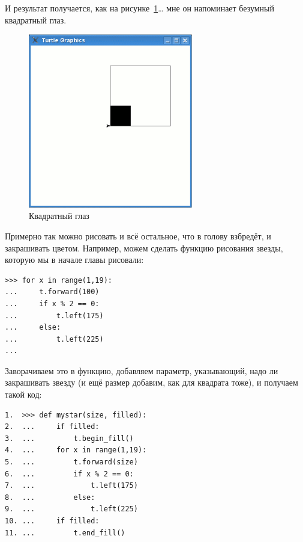 И результат получается, как на рисунке \ref{fig28}… мне он напоминает безумный квадратный глаз.

\begin{figure}
\begin{center}
\includegraphics[width=72mm]{../en/figure28.eps}
\end{center}
\caption{Квадратный глаз}\label{fig28}
\end{figure}

Примерно так можно рисовать и всё остальное, что в голову взбредёт, и закрашивать цветом. Например, можем сделать функцию рисования звезды, которую мы в начале главы рисовали:

\begin{listing}
\begin{verbatim}
>>> for x in range(1,19):
...     t.forward(100)
...     if x % 2 == 0:
...         t.left(175)
...     else:
...         t.left(225)
...
\end{verbatim}
\end{listing}

Заворачиваем это в функцию, добавляем параметр, указывающий, надо ли закрашивать звезду (и ещё размер добавим, как для квадрата тоже), и получаем такой код:

\begin{listing}
\begin{verbatim}
1.  >>> def mystar(size, filled):
2.  ...     if filled:
3.  ...         t.begin_fill()
4.  ...     for x in range(1,19):
5.  ...         t.forward(size)
6.  ...         if x % 2 == 0:
7.  ...             t.left(175)
8.  ...         else:
9.  ...             t.left(225)
10. ...     if filled:
11. ...         t.end_fill()
\end{verbatim}
\end{listing}

